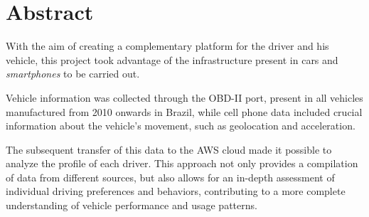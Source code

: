 \chapter*{Abstract}


With the aim of creating a complementary platform for the driver and his vehicle, this project took advantage of the infrastructure present in cars and \textit{smartphones} to be carried out.

Vehicle information was collected through the OBD-II port, present in all vehicles manufactured from 2010 onwards in Brazil, while cell phone data included crucial information about the vehicle's movement, such as geolocation and acceleration.

The subsequent transfer of this data to the AWS cloud made it possible to analyze the profile of each driver. This approach not only provides a compilation of data from different sources, but also allows for an in-depth assessment of individual driving preferences and behaviors, contributing to a more complete understanding of vehicle performance and usage patterns.

